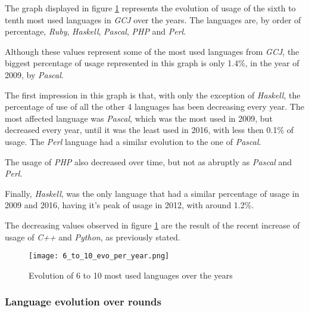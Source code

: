 \documentclass{article}
\begin{document}
\begin{multicols*}{2}


The graph displayed in figure \ref{fig:6_to_10_evo} represents the evolution of usage of the sixth to tenth most used languages in \textit{GCJ} over the years. The languages are, by order of percentage, \textit{Ruby}, \textit{Haskell}, \textit{Pascal}, \textit{PHP} and \textit{Perl}.

Although these values represent some of the most used languages from \textit{GCJ}, the biggest percentage of usage represented in this graph is only 1.4\%, in the year of 2009, by \textit{Pascal}.

The first impression in this graph is that, with only the exception of \textit{Haskell}, the percentage of use of all the other 4 languages has been decreasing every year. The most affected language was \textit{Pascal}, which was the most used in 2009, but decreased every year, until it was the least used in 2016, with less then 0.1\% of usage. The \textit{Perl} language had a similar evolution to the one of \textit{Pascal}.

The usage of \textit{PHP} also decreased over time, but not as abruptly as \textit{Pascal} and \textit{Perl}.

Finally, \textit{Haskell}, was the only language that had a similar percentage of usage in 2009 and 2016, having it's peak of usage in 2012, with around 1.2\%.

The decreasing values observed in figure \ref{fig:6_to_10_evo} are the result of the recent increase of usage of \textit{C++} and \textit{Python}, as previously stated.


\begin{figure}[H]
    \centering
    \texttt{[image: 6\_to\_10\_evo\_per\_year.png]}
    \caption{Evolution of 6 to 10 most used languages over the years}
    \label{fig:6_to_10_evo}
\end{figure}


\subsubsection{Language evolution over rounds}


\end{multicols*}
\end{document}
